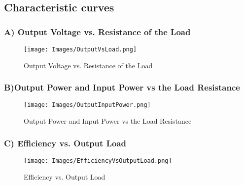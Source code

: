 \documentclass[11pt,a4paper]{article}
\begin{document}
 \subsection*{\Large \textbf{Characteristic curves}}

\subsubsection*{\large \textbf{A) Output Voltage vs. Resistance of the Load}}
\begin{figure}[H]
    \centering
    \texttt{[image: Images/OutputVsLoad.png]}
    \caption{Output Voltage vs. Resistance of the Load}
    \label{fig:OutputVsLoad}
\end{figure}

\subsubsection*{\large \textbf{B)Output Power and Input Power vs the Load Resistance }}
\begin{figure}[H]
    \centering
    \texttt{[image: Images/OutputInputPower.png]}
    \caption{Output Power and Input Power vs the Load Resistance}
    \label{fig:OutputInputPower}
\end{figure}

\subsubsection*{\large \textbf{C) Efficiency vs. Output Load}}
\begin{figure}[H]
    \centering
    \texttt{[image: Images/EfficiencyVsOutputLoad.png]}
    \caption{Efficiency vs. Output Load}
    \label{fig:EfficiencyVsOutputLoad}
\end{figure}
\end{document}
